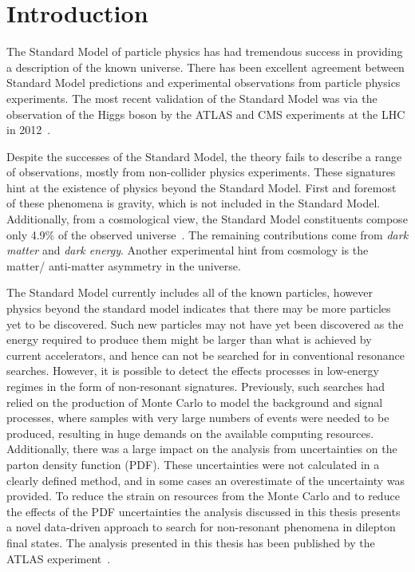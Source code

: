 \chapter{Introduction}\label{chap:intro}

The Standard Model of particle physics has had tremendous success in providing a description of the known universe. There has been excellent agreement between Standard Model predictions and experimental observations from particle physics experiments. The most recent validation of the Standard Model was via the observation of the Higgs boson by the ATLAS and CMS experiments at the LHC in 2012~\cite{Chatrchyan2012,Aad_2012}.

Despite the successes of the Standard Model, the theory fails to describe a range of observations, mostly from non-collider physics experiments. These signatures hint at the existence of physics beyond the Standard Model. First and foremost of these phenomena is gravity, which is not included in the Standard Model. Additionally, from a cosmological view, the Standard Model constituents compose only 4.9\% of the observed universe~\cite{Bennett_2013,2014Plank}. The remaining contributions come from \emph{dark matter} and \emph{dark energy}. Another experimental hint from cosmology is the matter/ anti-matter asymmetry in the universe. 

The Standard Model currently includes all of the known particles, however physics beyond the standard model indicates that there may be more particles yet to be discovered. Such new particles may not have yet been discovered as the energy required to produce them might be larger than what is achieved by current accelerators, and hence can not be searched for in conventional resonance searches. However, it is possible to detect the effects processes in low-energy regimes in the form of non-resonant signatures. Previously, such searches had relied on the production of Monte Carlo to model the background and signal processes, where samples with very large numbers of events were needed to be produced, resulting in huge demands on the available computing resources. Additionally, there was a large impact on the analysis from uncertainties on the parton density function (PDF). These uncertainties were not calculated in a clearly defined method, and in some cases an overestimate of the uncertainty was provided. To reduce the strain on resources from the Monte Carlo and to reduce the effects of the PDF uncertainties the analysis discussed in this thesis presents a novel data-driven approach to search for non-resonant phenomena in dilepton final states. The analysis presented in this thesis has been published by the ATLAS experiment~\cite{Aad:2020otl}. 

